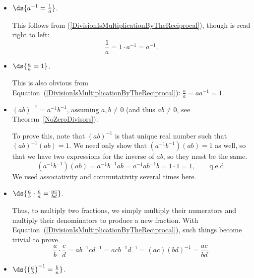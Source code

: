 \begin{itemize}
\item $\ds{a^{-1}=\frac1a}$.

This follows from (\ref{DivisionIsMultiplicationByTheReciprocal}),
though is read right to left:
$$\frac1a=1\cdot a^{-1}=a^{-1}.$$

\item $\ds{\frac{a}a=1}$.

This is also obvious from 
Equation~(\ref{DivisionIsMultiplicationByTheReciprocal}):
$\frac{a}a=aa^{-1}=1$.

\item $(ab)^{-1}=a^{-1}b^{-1}$, assuming $a,b\ne0$
(and thus $ab\ne0$, see 
Theorem~\ref{NoZeroDivisors}).

To prove this, note that $(ab)^{-1}$ is that
unique real number such that $(ab)^{-1}(ab)=1$.
We need only show that $(a^{-1}b^{-1})(ab)=1$ as well, so that we have two 
expressions for the inverse of $ab$, so they must be the same.
$$(a^{-1}b^{-1})(ab)=a^{-1}b^{-1}ab
=a^{-1}ab^{-1}b=1\cdot 1=1,\qquad \text{q.e.d.}$$
We used associativity and commutativity several
times here.\footnotemark
{}

\item $\ds{\frac{a}b\cdot\frac{c}d=\frac{ac}{bd}}$.

Thus, to multiply two fractions, we simply multiply their
numerators and multiply their denominators to 
produce a new fraction.
With Equation~(\ref{DivisionIsMultiplicationByTheReciprocal}),
such things become trivial to prove.
$$\frac{a}b\cdot\frac{c}d=ab^{-1}cd^{-1}
=acb^{-1}d^{-1}=(ac)(bd)^{-1}=\frac{ac}{bd}.$$

\item $\ds{\left(\frac{a}b\right)^{-1}=\frac{b}a}$.


\end{itemize}
